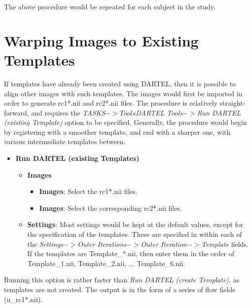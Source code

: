 The above procedure would be repeated for each subject in the study.

\section{Warping Images to Existing Templates}
If templates have already been created using DARTEL, then it is possible to align other images with such templates.
The images would first be imported in order to generate rc1*.nii and rc2*.nii files.
The procedure is relatively straight-forward, and requires the \emph{TASKS$->Tools$DARTEL Tools$->$Run DARTEL (existing Template)} option to be specified.
Generally, the procedure would begin by registering with a smoother template, and end with a sharper one, with various intermediate templates between.
\begin{itemize}
\item{{\bf Run DARTEL (existing Templates)}
  \begin{itemize}
  \item{{\bf Images}
    \begin{itemize}
    \item{{\bf Images}: Select the rc1*.nii files.}
    \item{{\bf Images}: Select the corresponding rc2*.nii files.}
    \end{itemize}
  }
  \item{{\bf Settings}: Most settings would be kept at the default values, except for the specification of the templates.
These are specified in within each of the \emph{Settings$->$Outer Iterations$->$Outer Iteration$->$Template} fields.
If the templates are Template\_*.nii, then enter them in the order of Template\_1.nii, Template\_2.nii, ... Template\_6.nii.
  }
  \end{itemize}
}
\end{itemize}

Running this option is rather faster than \emph{Run DARTEL (create Template)}, as templates are not created.
The output is in the form of a series of flow fields (u\_rc1*.nii).

